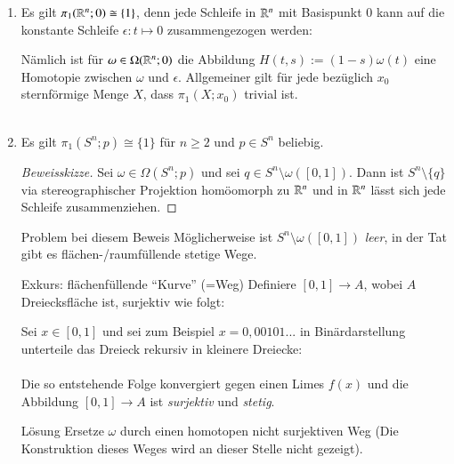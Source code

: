\documentclass[a4paper,10pt]{scrartcl}
\newcommand{\homo}{\cong}
\begin{document}
\begin{exs*}
 \begin{enumerate}[(1)]
  \item Es gilt $\pi_1(\R^n;0)\homo \{1\}$, denn jede Schleife in $\mathbb{R}^n$ mit Basispunkt $0$ kann auf die konstante Schleife $\epsilon: t \mapsto 0$ zusammengezogen werden:

Nämlich ist für $\omega \in \Omega(\mathbb{R}^n;0)$ die Abbildung $H(t,s):=(1-s)\omega(t)$ eine Homotopie zwischen $\omega$ und $\epsilon$. Allgemeiner gilt für jede bezüglich $x_0$ sternförmige Menge $X$, dass $\pi_1(X;x_0)$ trivial ist.\\
\fixme[fig57]\\
\item Es gilt $\pi_1(S^n; p) \homo \{1\}$ für $n\ge 2$ und $p\in S^n$ beliebig.\\
\fixme[fig58]
\begin{proof}[Beweisskizze]
\fixme[fig59]
 Sei $\omega \in \Omega(S^n;p)$ und sei $q\in S^n\setminus \omega([0,1])$. Dann ist $S^n\setminus\{q\}$ via stereographischer Projektion homöomorph zu $\mathbb{R}^n$ und in $\mathbb{R}^n$ lässt sich jede Schleife zusammenziehen.
\end{proof}
\begin{seg}{Problem bei diesem Beweis}
 Möglicherweise ist $S^n \setminus \omega([0,1])$ \emph{leer}, in der Tat gibt es flächen-/raumfüllende stetige Wege.
\end{seg}
\begin{seg}{Exkurs: flächenfüllende "`Kurve"' (=Weg)}
 Definiere $[0,1] \to A $, wobei $A$ Dreiecksfläche ist, surjektiv wie folgt:

Sei $x\in [0,1]$ und sei zum  Beispiel $x=0,00101...$ in Binärdarstellung unterteile das Dreieck rekursiv in kleinere Dreiecke:\\
\fixme[fig60]\\
Die so entstehende Folge konvergiert gegen einen Limes $f(x)$ und die Abbildung $[0,1]\to A$ ist \emph{surjektiv} und \emph{stetig}.
\end{seg}
\begin{seg}{Lösung}
Ersetze $\omega$ durch einen homotopen nicht surjektiven Weg (Die Konstruktion dieses Weges wird an dieser Stelle nicht gezeigt).
\end{seg}


\end{enumerate}
\end{exs*}
\end{document}
